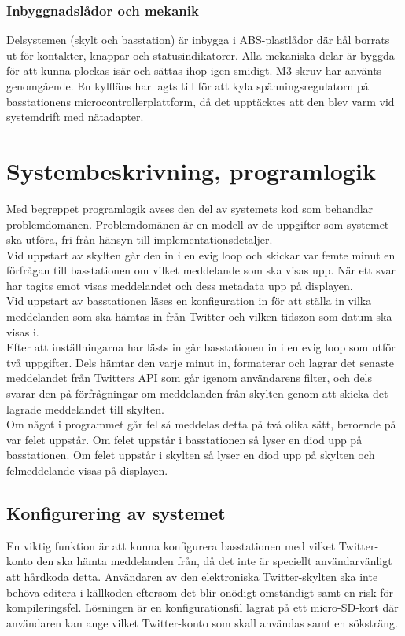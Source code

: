 \documentclass[a4paper,11pt]{article}
\begin{document}
\subsubsection{Inbyggnadslådor och mekanik}
Delsystemen (skylt och basstation) är inbygga i ABS-plastlådor där hål borrats ut för kontakter, knappar och statusindikatorer. Alla mekaniska delar är byggda för att kunna plockas isär och sättas ihop igen smidigt. M3-skruv har använts genomgående. En kylfläns har lagts till för att kyla spänningsregulatorn på basstationens microcontrollerplattform, då det upptäcktes att den blev varm vid systemdrift med nätadapter.

\section{Systembeskrivning, programlogik}
\label{programlogik}
Med begreppet programlogik avses den del av systemets kod som behandlar problemdomänen. Problemdomänen är en modell av de uppgifter som systemet ska utföra, fri från hänsyn till implementationsdetaljer.\\

Vid uppstart av skylten går den in i en evig loop och skickar var femte minut en förfrågan till basstationen om vilket meddelande som ska visas upp. När ett svar har tagits emot visas meddelandet och dess metadata upp på displayen.\\

Vid uppstart av basstationen läses en konfiguration in för att ställa in vilka meddelanden som ska hämtas in från Twitter och vilken tidszon som datum ska visas i.\\

Efter att inställningarna har lästs in går basstationen in i en evig loop som utför två uppgifter. Dels hämtar den varje minut in, formaterar och lagrar det senaste meddelandet från Twitters API som går igenom användarens filter, och dels svarar den på förfrågningar om meddelanden från skylten genom att skicka det lagrade meddelandet till skylten.\\

Om något i programmet går fel så meddelas detta på två olika sätt, beroende på var felet uppstår. Om felet uppstår i basstationen så lyser en diod upp på basstationen. Om felet uppstår i skylten så lyser en diod upp på skylten och felmeddelande visas på displayen.

\subsection{Konfigurering av systemet}
En viktig funktion är att kunna konfigurera basstationen med vilket Twitter-konto den ska hämta meddelanden från, då det inte är speciellt användarvänligt att hårdkoda detta. Användaren av den elektroniska Twitter-skylten ska inte behöva editera i källkoden eftersom det blir onödigt omständigt samt en risk för kompileringsfel. Lösningen är en konfigurationsfil lagrat på ett micro-SD-kort där användaren kan ange vilket Twitter-konto som skall användas samt en söksträng.\\
\end{document}

